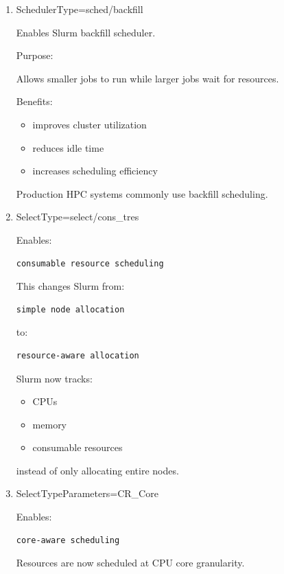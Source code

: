 \documentclass[11pt]{article}
\begin{document}
\begin{enumerate}
\begin{enumerate}
\item SchedulerType=sched/backfill
\label{sec:orgc79773d}

Enables Slurm backfill scheduler.

Purpose:

Allows smaller jobs to run while larger jobs wait for resources.

Benefits:

\begin{itemize}
\item improves cluster utilization
\item reduces idle time
\item increases scheduling efficiency
\end{itemize}

Production HPC systems commonly use backfill scheduling.
\item SelectType=select/cons\_tres
\label{sec:org82cdfb3}

Enables:

\begin{verbatim}
consumable resource scheduling
\end{verbatim}

This changes Slurm from:

\begin{verbatim}
simple node allocation
\end{verbatim}

to:

\begin{verbatim}
resource-aware allocation
\end{verbatim}

Slurm now tracks:

\begin{itemize}
\item CPUs
\item memory
\item consumable resources
\end{itemize}

instead of only allocating entire nodes.
\item SelectTypeParameters=CR\_Core
\label{sec:org6b8b81a}

Enables:

\begin{verbatim}
core-aware scheduling
\end{verbatim}

Resources are now scheduled at CPU core granularity.


\end{enumerate}
\end{enumerate}
\end{document}

